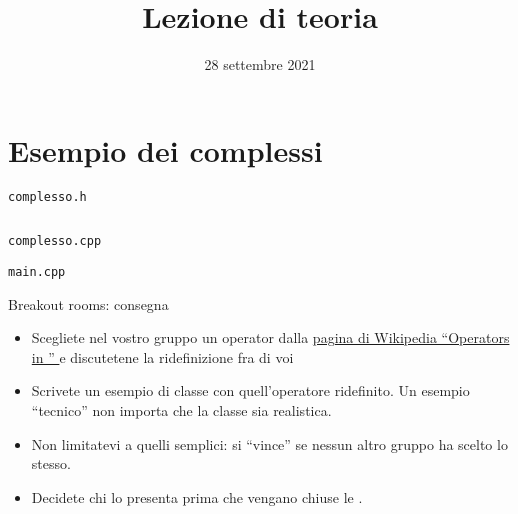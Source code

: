 \documentclass[xcolor={dvipsnames, svgnames, x11names, table}, 10pt]{beamer}
\title{Lezione di teoria}
\date{28 settembre 2021}
\institute{%
    \textbf{Obiettivi di apprendimento}:
    \begin{itemize}
        \item Ridefinizione degli operatori;
        \item ereditarietà.
    \end{itemize}%
}
\begin{document}
\frame{\titlepage}

\Sommario

\section{Esempio dei complessi}

\begin{frame}[fragile]{\texttt{complesso.h}}

\begin{columns}
    \column{\dimexpr\paperwidth-30pt}
\end{columns}
\vspace*{\fill}

\end{frame}

\begin{frame}[fragile]{\texttt{complesso.cpp}}


\end{frame}

\begin{frame}[fragile]{\texttt{main.cpp}}


\end{frame}

\begin{frame}{Breakout rooms: consegna}
    \begin{itemize}
        \item Scegliete nel vostro gruppo un operator dalla \href{https://en.wikipedia.org/wiki/Operators\_in\_C\_and\_C\%2B\%2B}{pagina di Wikipedia \enquote{Operators in \cplusplus} \ExternalLink} e discutetene la ridefinizione fra di voi
        \item Scrivete un esempio di classe con quell'operatore ridefinito. Un esempio \enquote{tecnico} non importa che la classe sia realistica.
        \item Non limitatevi a quelli semplici: si \enquote{vince} se nessun altro gruppo ha scelto lo stesso.
        \item Decidete chi lo presenta prima che vengano chiuse le .
    \end{itemize}
\end{frame}
\end{document}
